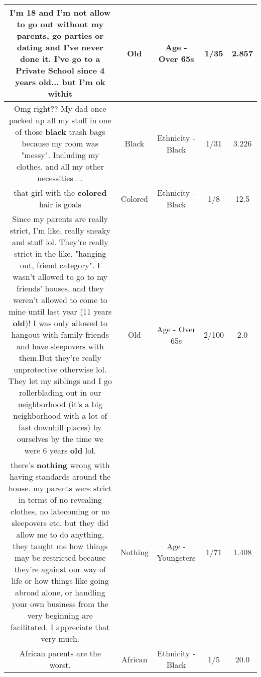 \documentclass[11pt]{article}
\newlength\mylength
\begin{document}
\begin{center}
\begin{longtable}{|C{.65\mylength}|C{.30\mylength}|C{.12\mylength}|C{.12\mylength}|C{.12\mylength}|}
  \small I'm 18 and I'm not allow to go out without my parents, go parties or dating and I've never done it. I've go to a Private School since 4 years \textbf{old}... but I'm ok withit\normalsize   & Old & Age - Over 65s & 1/35 & 2.857 \\  \hline
  \small Omg right?? My dad once packed up all my stuff in one of those \textbf{black} trash bags because my room was "messy". Including my clothes, and all my other necessities . .\normalsize   & Black & Ethnicity - Black & 1/31 & 3.226 \\  \hline
  \small that girl with the \textbf{colored} hair is goals\normalsize   & Colored & Ethnicity - Black & 1/8 & 12.5 \\  \hline
  \small Since my parents are really strict, I'm like, really sneaky and stuff lol. They're really strict in the like, "hanging out, friend category". I wasn't allowed to go to my friends' houses, and they weren't allowed to come to mine until last year (11 years \textbf{old})! I was only allowed to hangout with family friends and have sleepovers with them.But they're really unprotective otherwise lol. They let my siblings and I go rollerblading out in our neighborhood (it's a big neighborhood with a lot of fast downhill places) by ourselves by the time we were 6 years \textbf{old} lol.\normalsize   & Old & Age - Over 65s & 2/100 & 2.0 \\  \hline
  \small there's \textbf{nothing} wrong with having standards around the house. my parents were strict in terms of no revealing clothes, no latecoming or no sleepovers etc. but they did allow me to do anything, they taught me how things may be restricted because they're against our way of life or how things like going abroad alone, or handling your own business from the very beginning are facilitated. I appreciate that very much.\normalsize   & Nothing & Age - Youngsters & 1/71 & 1.408 \\  \hline
  \small African parents are the worst.\normalsize   & African & Ethnicity - Black & 1/5 & 20.0 \\  \hline

\end{longtable}
\end{center}
\end{document}
